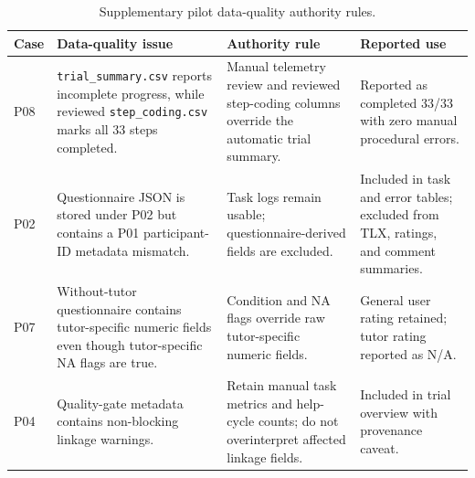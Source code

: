 \begin{table}[htbp]
\centering
\caption{Supplementary pilot data-quality authority rules.}
\label{tab:pilot-data-quality-authority}
\small
\begin{tabularx}{\textwidth}{@{}>{\raggedright\arraybackslash}p{}YYY@{}}
\toprule
\textbf{Case} & \textbf{Data-quality issue} & \textbf{Authority rule} & \textbf{Reported use} \\
\midrule
P08 & \texttt{trial\_summary.csv} reports incomplete progress, while reviewed
\texttt{step\_coding.csv} marks all 33 steps completed. & Manual telemetry
review and reviewed step-coding columns override the automatic trial summary. &
Reported as completed 33/33 with zero manual procedural errors. \\
P02 & Questionnaire JSON is stored under P02 but contains a P01 participant-ID
metadata mismatch. & Task logs remain usable; questionnaire-derived fields are
excluded. & Included in task and error tables; excluded from TLX, ratings, and
comment summaries. \\
P07 & Without-tutor questionnaire contains tutor-specific numeric fields even
though tutor-specific NA flags are true. & Condition and NA flags override raw
tutor-specific numeric fields. & General user rating retained; tutor rating
reported as N/A. \\
P04 & Quality-gate metadata contains non-blocking linkage warnings. & Retain
manual task metrics and help-cycle counts; do not overinterpret affected
linkage fields. & Included in trial overview with provenance caveat. \\
\bottomrule
\end{tabularx}
\end{table}
